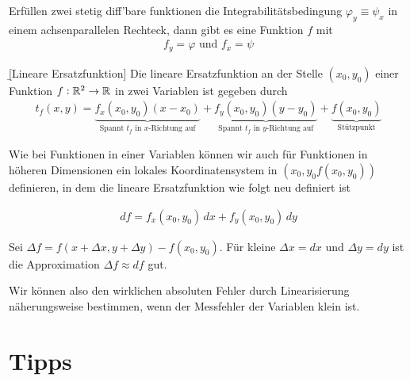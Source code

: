 \documentclass[12pt]{article}
\begin{document}
\begin{fct}
        Erfüllen zwei stetig diff'bare funktionen die Integrabilitätsbedingung $\varphi_y\equiv\psi_x$ in einem achsenparallelen Rechteck, dann gibt es eine Funktion $f$ mit
        \begin{align}
                f_y=\varphi\text{ und }f_x=\psi
        \end{align}
\end{fct}

\begin{defn}{\b{[Lineare Ersatzfunktion]}}
        Die lineare Ersatzfunktion an der Stelle $(x_0,y_0)$ einer Funktion $f:\mathbb{R}^2\to\mathbb{R}$ in zwei Variablen ist gegeben durch
        \begin{align}
                t_f(x,y)=\underbrace{f_x(x_0,y_0)(x-x_0)}_{\text{Spannt $t_f$ in $x$-Richtung auf}}+\underbrace{f_y(x_0,y_0)(y-y_0)}_{\text{Spannt $t_f$ in $y$-Richtung auf}}+\underbrace{f(x_0,y_0)}_{\text{Stützpunkt}}
        \end{align}
\end{defn}

Wie bei Funktionen in einer Variablen können wir auch für Funktionen in höheren
Dimensionen ein lokales Koordinatensystem in $(x_0,y_0f(x_0,y_0))$ definieren,
in dem die lineare Ersatzfunktion wie folgt neu definiert ist\vspace*{0.3em}

\begin{thmb}{}
        \begin{align}
                df = f_x(x_0,y_0)\,dx+f_y(x_0,y_0)\,dy
        \end{align}
\end{thmb}\vspace*{1em}

\begin{fct}
        Sei $\Delta f=f(x+\Delta x,y+\Delta y)-f(x_0,y_0)$. Für kleine $\Delta x = dx$ und $\Delta y = dy$ ist die Approximation $\Delta f \approx df$ gut.
\end{fct}

Wir können also den wirklichen absoluten Fehler durch Linearisierung
näherungsweise bestimmen, wenn der Messfehler der Variablen klein ist.

\section{Tipps}
\setcounter{nexc}{1}
\end{document}

